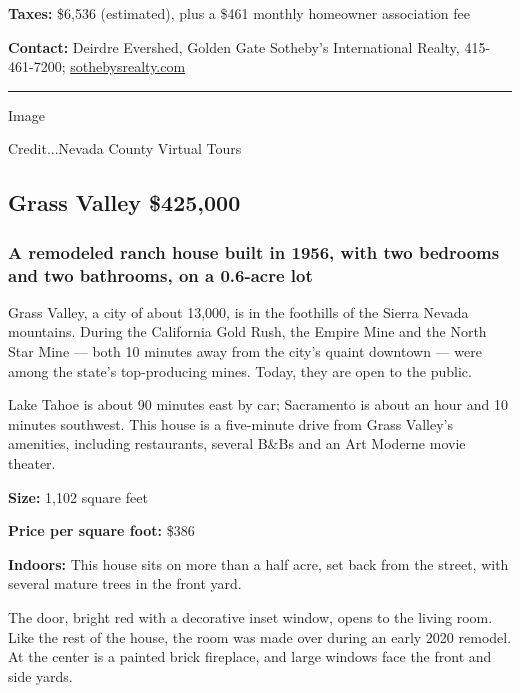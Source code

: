 \textbf{Taxes:} \$6,536 (estimated), plus a \$461 monthly homeowner
association fee

\textbf{Contact:} Deirdre Evershed, Golden Gate Sotheby's International
Realty, 415-461-7200;
\href{https://www.sothebysrealty.com/eng/sales/detail/180-l-517-dm98bn/25-forest-lane-san-rafael-ca-94903}{sothebysrealty.com}

\begin{center}\rule{0.5\linewidth}{\linethickness}\end{center}

Image

Credit...Nevada County Virtual Tours

\hypertarget{grass-valley--425000}{%
\subsection{Grass Valley \textbar{}
\$425,000}\label{grass-valley--425000}}

\hypertarget{a-remodeled-ranch-house-built-in-1956-with-two-bedrooms-and-two-bathrooms-on-a-06-acre-lot}{%
\subsubsection{\texorpdfstring{\textbf{A remodeled ranch house built in
1956, with two bedrooms and two bathrooms, on a 0.6-acre
lot}}{A remodeled ranch house built in 1956, with two bedrooms and two bathrooms, on a 0.6-acre lot}}\label{a-remodeled-ranch-house-built-in-1956-with-two-bedrooms-and-two-bathrooms-on-a-06-acre-lot}}

Grass Valley, a city of about 13,000, is in the foothills of the Sierra
Nevada mountains. During the California Gold Rush, the Empire Mine and
the North Star Mine --- both 10 minutes away from the city's quaint
downtown --- were among the state's top-producing mines. Today, they are
open to the public.

Lake Tahoe is about 90 minutes east by car; Sacramento is about an hour
and 10 minutes southwest. This house is a five-minute drive from Grass
Valley's amenities, including restaurants, several B\&Bs and an Art
Moderne movie theater.

\textbf{Size:} 1,102 square feet

\textbf{Price per square foot:} \$386

\textbf{Indoors:} This house sits on more than a half acre, set back
from the street, with several mature trees in the front yard.

The door, bright red with a decorative inset window, opens to the living
room. Like the rest of the house, the room was made over during an early
2020 remodel. At the center is a painted brick fireplace, and large
windows face the front and side yards.

